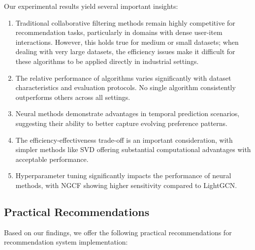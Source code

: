 \documentclass[sigconf,nonacm]{acmart} %
\begin{document}
Our experimental results yield several important insights:  

\begin{enumerate}  
    \item Traditional collaborative filtering methods remain highly competitive for recommendation tasks, particularly in domains with dense user-item interactions. However, this holds true for medium or small datasets; when dealing with very large datasets, the efficiency issues make it difficult for these algorithms to be applied directly in industrial settings. 
    
    \item The relative performance of algorithms varies significantly with dataset characteristics and evaluation protocols. No single algorithm consistently outperforms others across all settings.  
    
    \item Neural methods demonstrate advantages in temporal prediction scenarios, suggesting their ability to better capture evolving preference patterns.  
    
    \item The efficiency-effectiveness trade-off is an important consideration, with simpler methods like SVD offering substantial computational advantages with acceptable performance.  
    
    \item Hyperparameter tuning significantly impacts the performance of neural methods, with NGCF showing higher sensitivity compared to LightGCN.  
\end{enumerate}  

\subsection{Practical Recommendations}  

Based on our findings, we offer the following practical recommendations for recommendation system implementation:  
\end{document}

